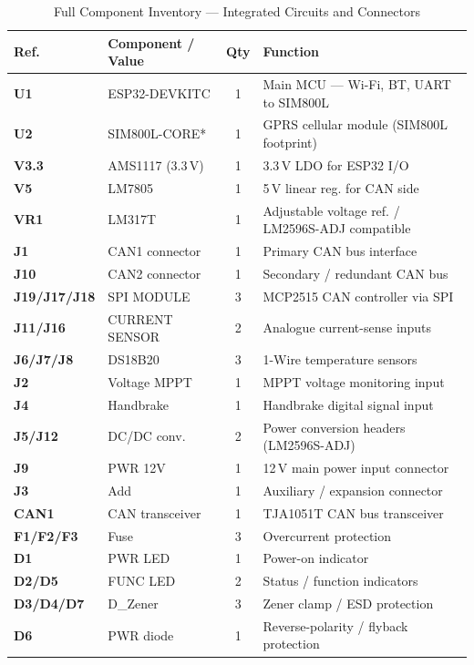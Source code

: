 \begin{table}[H]
\centering
\caption{Full Component Inventory --- Integrated Circuits and Connectors}
\label{tab:bom-ics}
\small
\begin{tabular}{>{\bfseries}p{2.4cm} p{3.2cm} c p{5.8cm}}
\toprule
Ref. & Component / Value & Qty & Function \\
\midrule
U1           & ESP32-DEVKITC        & 1 & Main MCU --- Wi-Fi, BT, UART to SIM800L \\
U2           & SIM800L-CORE*        & 1 & GPRS cellular module (SIM800L footprint) \\
V3.3         & AMS1117 (3.3\,V)     & 1 & 3.3\,V LDO for ESP32 I/O \\
V5           & LM7805               & 1 & 5\,V linear reg. for CAN side \\
VR1          & LM317T               & 1 & Adjustable voltage ref. / LM2596S-ADJ compatible \\
J1           & CAN1 connector       & 1 & Primary CAN bus interface \\
J10          & CAN2 connector       & 1 & Secondary / redundant CAN bus \\
J19/J17/J18  & SPI MODULE           & 3 & MCP2515 CAN controller via SPI \\
J11/J16      & CURRENT SENSOR       & 2 & Analogue current-sense inputs \\
J6/J7/J8     & DS18B20              & 3 & 1-Wire temperature sensors \\
J2           & Voltage MPPT         & 1 & MPPT voltage monitoring input \\
J4           & Handbrake            & 1 & Handbrake digital signal input \\
J5/J12       & DC/DC conv.          & 2 & Power conversion headers (LM2596S-ADJ) \\
J9           & PWR 12V              & 1 & 12\,V main power input connector \\
J3           & Add                  & 1 & Auxiliary / expansion connector \\
CAN1         & CAN transceiver      & 1 & TJA1051T CAN bus transceiver \\
F1/F2/F3     & Fuse                 & 3 & Overcurrent protection \\
D1           & PWR LED              & 1 & Power-on indicator \\
D2/D5        & FUNC LED             & 2 & Status / function indicators \\
D3/D4/D7     & D\_Zener             & 3 & Zener clamp / ESD protection \\
D6           & PWR diode            & 1 & Reverse-polarity / flyback protection \\
\bottomrule
\end{tabular}
\end{table}


